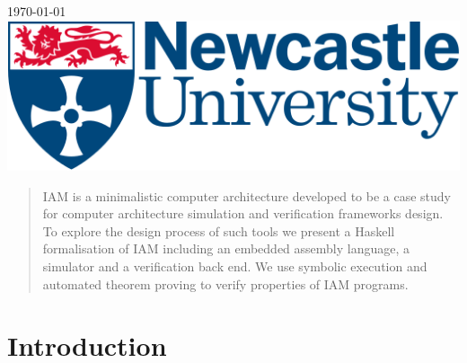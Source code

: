 \begin{titlepage}


{\large \today}\\[2cm] %


\includegraphics[scale=0.5]{logo.png}\\[1cm] %


\vfill %

\end{titlepage}

\begin{abstract}
IAM is a minimalistic computer architecture developed to be
a case study for computer architecture simulation and verification frameworks
design. To explore the design process of such tools we present a Haskell formalisation
of IAM including an embedded assembly language, a simulator and a verification back end.
We use symbolic execution and automated theorem proving to verify properties of IAM programs.

\end{abstract}

\tableofcontents

\section{Introduction}

